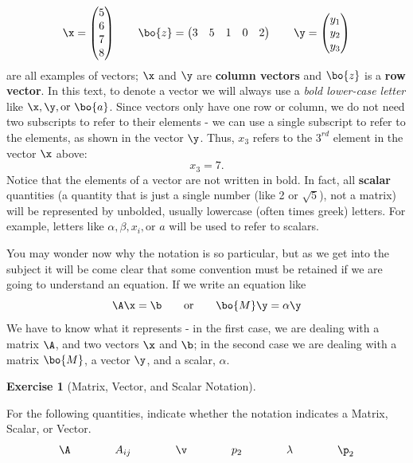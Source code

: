 \documentclass[
]{article}
\theoremstyle{definition}
\theoremstyle{definition}
\theoremstyle{definition}
\newtheorem{exercise}{Exercise}[section]
\theoremstyle{definition}
\theoremstyle{remark}
\begin{document}
\[\x=\left(\begin{matrix} 5\\6\\7\\8 \end{matrix}\right) \qquad \bo{z}=\left(\begin{matrix} 3 & 5 & 1 & 0 & 2 \end{matrix}\right) \qquad \y = \left(\begin{matrix} y_1\\y_2\\y_3 \end{matrix}\right)\]
are all examples of vectors; \(\x\) and \(\y\) are \textbf{column vectors} and \(\bo{z}\) is a \textbf{row vector}. In this text, to denote a vector we will always use a \emph{bold lower-case letter} like \(\x, \y, \mbox{or } \bo{a}\). Since vectors only have one row or column, we do not need two subscripts to refer to their elements - we can use a single subscript to refer to the elements, as shown in the vector \(\y\). Thus, \(x_3\) refers to the \(3^{rd}\) element in the vector \(\x\) above: \[x_3 = 7.\] Notice that the elements of a vector are not written in bold. In fact, all \textbf{scalar} quantities (a quantity that is just a single number (like 2 or \(\sqrt{5}\)), not a matrix) will be represented by unbolded, usually lowercase (often times greek) letters. For example, letters like \(\alpha, \beta, x_i, \mbox{or } a\) will be used to refer to scalars.

You may wonder now why the notation is so particular, but as we get into the subject it will be come clear that some convention must be retained if we are going to understand an equation. If we write an equation like
\[\A\x=\b \qquad \mbox{or} \qquad \bo{M}\y=\alpha\y\]
We have to know what it represents - in the first case, we are dealing with a matrix \(\A\), and two vectors \(\x\) and \(\b\); in the second case we are dealing with a matrix \(\bo{M}\), a vector \(\y\), and a scalar, \(\alpha\).

\begin{exercise}[Matrix, Vector, and Scalar Notation]
\protect\hypertarget{exr:matnot}{}\label{exr:matnot}

For the following quantities, indicate whether the notation indicates a Matrix, Scalar, or Vector.
\vspace{.5cm}
\[\A \qquad \qquad A_{ij} \qquad \qquad \v \qquad \qquad  p_2 \qquad \qquad  \lambda  \qquad \qquad \p_2\]
\vspace{.5cm}

\end{exercise}
\end{document}
